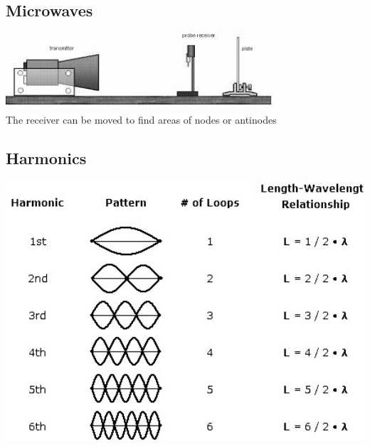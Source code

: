 \documentclass{article}[18pt]
\begin{document}
\subsection{Microwaves}
\includegraphics[width=10cm]{Microwaves.jpg}\\
The receiver can be moved to find areas of nodes or antinodes
\subsection{Harmonics}
\includegraphics[width=15cm]{Harmonics.jpg}\\
\end{document}
